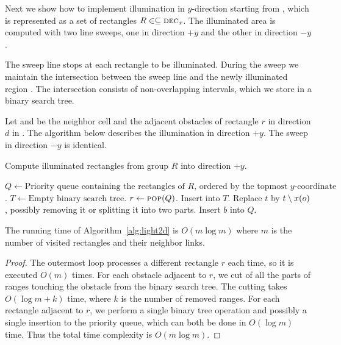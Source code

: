 \documentclass[english,gradu]{tktltiki2018}
\begin{document}
Next we show how to implement illumination in $y$-direction starting from , which is represented as a set of rectangles $R\in\subseteq\textsc{dec}_{x}$.
The illuminated area is computed with two line sweeps, one in direction $+y$ and the other in direction $-y$.

The sweep line stops at each rectangle to be illuminated.
During the sweep we maintain the intersection between the sweep line and the newly illuminated region .
The intersection consists of non-overlapping intervals, which we store in a binary search tree.

Let  and  be the neighbor cell and the adjacent obstacles of rectangle $r$ in direction $d$ in .
The algorithm below describes the illumination in direction $+y$.
The sweep in direction $-y$ is identical.

\begin{alg}\label{alg:light2d}
Compute illuminated rectangles from group $R$ into direction $+y$.
\begin{algorithmic}
\State $Q\gets\text{Priority queue containing the rectangles of $R$, ordered by the topmost $y$-coordinate}$.
\State $T\gets\text{Empty binary search tree}$.
	\State $r\gets\textsc{pop}(Q)$.
		\State Insert  into $T$.
	\EndIf
			\State Replace $t$ by $t\setminus x(o)$, possibly removing it or splitting it into two parts.
		\EndFor
	\EndFor
			\State Insert $b$ into $Q$.
		\EndIf
	\EndFor
\EndWhile
\end{algorithmic}
\end{alg}

\begin{lem}\label{lem:light2dtime}The running time of Algorithm~\ref{alg:light2d} is $O(m\log m)$ where $m$ is the number of visited rectangles and their neighbor links.\end{lem}
\begin{proof}
The outermost loop processes a different rectangle $r$ each time, so it is executed $O(m)$ times.
For each obstacle adjacent to $r$, we cut of all the parts of ranges touching the obstacle from the binary search tree.
The cutting takes $O(\log m + k)$ time, where $k$ is the number of removed ranges.
For each rectangle adjacent to $r$, we perform a single binary tree operation and possibly a single insertion to the priority queue, which can both be done in $O(\log m)$ time.
Thus the total time complexity is $O(m\log m)$.
\end{proof}
\end{document}
